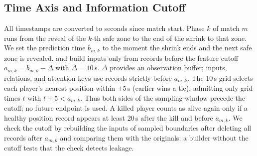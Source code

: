 \documentclass[sigconf,anonymous,nonacm]{acmart}
\begin{document}
\subsection{Time Axis and Information Cutoff}
All timestamps are converted to seconds since match start.
Phase $k$ of match $m$ runs from the reveal of the $k$-th safe zone to the end of the shrink to that zone.
We set the prediction time $b_{m,k}$ to the moment the shrink ends and the next safe zone is revealed, and build inputs only from records before the feature cutoff $a_{m,k}=b_{m,k}-\Delta$ with $\Delta=10$\,s.
$\Delta$ provides an observation buffer; inputs, relations, and attention keys use records strictly before $a_{m,k}$. The 10\,s grid selects each player's nearest position within $\pm5$\,s (earlier wins a tie), admitting only grid times $t$ with $t+5<a_{m,k}$. Thus both sides of the sampling window precede the cutoff; no future endpoint is used.
A killed player counts as alive again only if a healthy position record appears at least 20\,s after the kill and before $a_{m,k}$.
We check the cutoff by rebuilding the inputs of sampled boundaries after deleting all records after $a_{m,k}$ and comparing them with the originals; a builder without the cutoff tests that the check detects leakage.
\end{document}
